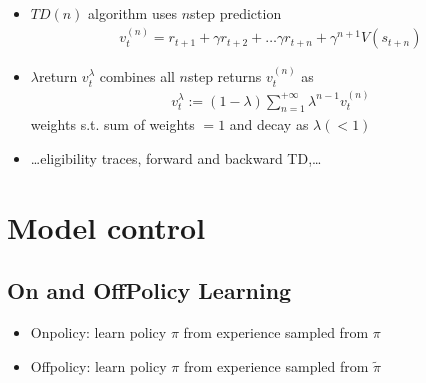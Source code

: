 \documentclass[letterpaper,10pt,english]{jupyterBook}
\begin{document}
\begin{itemize}
\begin{itemize}
\item {} 
\sphinxAtStartPar
\(TD(n)\) algorithm uses \(n\)\sphinxhyphen{}step prediction
\begin{equation*}
\begin{split}v_t^{(n)} = r_{t+1} + \gamma r_{t+2} + \dots \gamma r_{t+n} + \gamma^{n+1} V(s_{t+n})\end{split}
\end{equation*}
\item {} 
\sphinxAtStartPar
\(\lambda\)\sphinxhyphen{}return \(v_t^\lambda\) combines all \(n\)\sphinxhyphen{}step returns \(v^{(n)}_t\) as
\begin{equation*}
\begin{split}v_t^{\lambda} := (1-\lambda) \sum_{n=1}^{+\infty} \lambda^{n-1} v_t^{(n)}\end{split}
\end{equation*}
\sphinxAtStartPar
weights s.t. sum of weights \(=1\) and decay as \(\lambda ( < 1)\)

\item {} 
\sphinxAtStartPar
…eligibility traces, forward and backward TD,…

\end{itemize}

\end{itemize}


\section{Model control}
\label{\detokenize{ch/rl/mdp_sol_rl:model-control}}\label{\detokenize{ch/rl/mdp_sol_rl:rl-mdp-sol-rl-control}}

\subsection{On\sphinxhyphen{} and Off\sphinxhyphen{}Policy Learning}
\label{\detokenize{ch/rl/mdp_sol_rl:on-and-off-policy-learning}}\label{\detokenize{ch/rl/mdp_sol_rl:rl-mdp-sol-rl-control-improv}}\begin{itemize}
\item {} 
\sphinxAtStartPar
On\sphinxhyphen{}policy: learn policy \(\pi\) from experience sampled from \(\pi\)

\item {} 
\sphinxAtStartPar
Off\sphinxhyphen{}policy: learn policy \(\pi\) from experience sampled from \(\widetilde{\pi}\)

\end{itemize}
\end{document}
